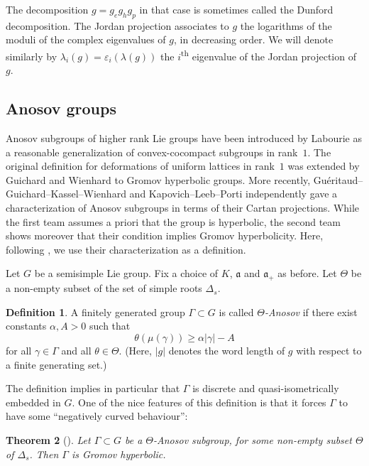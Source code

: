\documentclass[11pt]{article}
\numberwithin{equation}{section}
\newtheorem{theo}{Theorem}[section]
\theoremstyle{definition}
\newtheorem{defi}[theo]{Definition}
\newcommand{\fa}{\mathfrak{a}}
\let\epsilon\varepsilon
\let\G\Gamma
\let\g\gamma
\begin{document}
The decomposition $g = g_e g_h g_p$ in that case is sometimes called the Dunford decomposition. The Jordan projection associates to $g$ the logarithms of the moduli of the complex eigenvalues of $g$, in decreasing order. We will denote similarly by $\lambda_i(g)= \epsilon_i(\lambda(g))$ the $i$\textsuperscript{th} eigenvalue of the Jordan projection of $g$.

\subsection{Anosov groups}\label{subsubsec-Anosov representation}

Anosov subgroups of higher rank Lie groups have been introduced by Labourie \cite{labourie2006anosov} as a reasonable generalization of convex-cocompact subgroups in rank~$1$. The original definition for deformations of uniform lattices in rank~$1$ was extended by Guichard and Wienhard to Gromov hyperbolic groups. More recently, Guéritaud--Guichard--Kassel--Wienhard \cite{gueritaud20017anosov} and Kapovich--Leeb--Porti \cite{kapovich2017anosov} independently gave a characterization of Anosov subgroups in terms of their Cartan projections. While the first team assumes a priori that the group is hyperbolic, the second team shows moreover that their condition implies Gromov hyperbolicity. Here, following \cite{Guichard}, we use their characterization as a definition.

Let $G$ be a semisimple Lie group. Fix a choice of $K$, $\fa$ and $\fa_+$ as before. Let $\Theta$ be a non-empty subset of the set of simple roots $\Delta_s$.

\begin{defi}
A finitely generated group $\G \subset G$ is called \emph{$\Theta$-Anosov} if there exist constants $\alpha, A>0$ such that
\[\theta(\mu(\g)) \geq \alpha \vert \g \vert - A \]
for all $\g\in \G$ and all $\theta \in \Theta$.
(Here, $\vert g \vert$ denotes the word length of $g$ with respect to a finite generating set.)
\end{defi}
The definition implies in particular that $\G$ is discrete and quasi-isometrically embedded in $G$. One of the nice features of this definition is that it forces $\Gamma$ to have some ``negatively curved behaviour'':

\begin{theo}[{\cite[Th.\,6.15]{kapovich2018anosov}}]
Let $\G \subset G$ be a $\Theta$-Anosov subgroup, for some non-empty subset $\Theta$ of $\Delta_s$. Then $\G$ is Gromov hyperbolic.
\end{theo}
\end{document}
